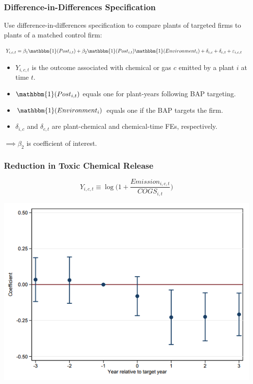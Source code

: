 \documentclass{beamer}
\newcommand{\one}{\mathbbm{1}}
\begin{document}
\begin{frame}
\frametitle{Difference-in-Differences Specification}

Use difference-in-differences specification to compare plants of targeted firms to plants of a matched control firm:

\begin{align*}
Y_{i,c,t} &= \beta_1 \one(Post_{i,t}) + \beta_2 \one(Post_{i,t}) \one(Environment_i)+\delta_{i,c} + \delta_{c,t} + \varepsilon_{i,c,t}
\end{align*}

\begin{itemize}[<+->]
\item $Y_{i,c,t}$ is the outcome associated with chemical or gas $c$ emitted by a plant $i$ at time $t$.
\item $\one(Post_{i,t})$ equals one for plant-years following BAP targeting.
\item $\one(Environment_i)$ equals one if the BAP targets the firm.
\item $\delta_{i,c}$ and $\delta_{c,t}$ are plant-chemical and chemical-time FEs, respectively.
\end{itemize}

\bigskip

$\implies \beta_2$ is coefficient of interest.

\end{frame}

\begin{frame}
\frametitle{Reduction in Toxic Chemical Release}

\scriptsize
$$
Y_{i,c,t} \equiv \log\Bigg(1 + \frac{Emission_{i,c,t}}{COGS_{i,t}}\Bigg)
$$

\centering
\includegraphics[scale=0.45]{pollution}
\end{frame}
\end{document}
